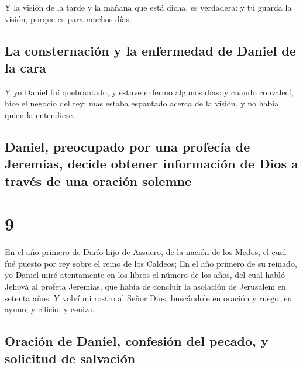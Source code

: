  Y la visión de la tarde y la mañana que está dicha, es
verdadera: y tú guarda la visión, porque es para muchos días.

\hypertarget{la-consternaciuxf3n-y-la-enfermedad-de-daniel-de-la-cara}{%
\subsection{La consternación y la enfermedad de Daniel de la
cara}\label{la-consternaciuxf3n-y-la-enfermedad-de-daniel-de-la-cara}}

 Y yo Daniel fuí quebrantado, y estuve enfermo algunos
días: y cuando convalecí, hice el negocio del rey; mas estaba espantado
acerca de la visión, y no había quien la entendiese.

\hypertarget{daniel-preocupado-por-una-profecuxeda-de-jeremuxedas-decide-obtener-informaciuxf3n-de-dios-a-travuxe9s-de-una-oraciuxf3n-solemne}{%
\subsection{Daniel, preocupado por una profecía de Jeremías, decide
obtener información de Dios a través de una oración
solemne}\label{daniel-preocupado-por-una-profecuxeda-de-jeremuxedas-decide-obtener-informaciuxf3n-de-dios-a-travuxe9s-de-una-oraciuxf3n-solemne}}

\hypertarget{section-8}{%
\section{9}\label{section-8}}

 En el año primero de Darío hijo de Assuero, de la nación
de los Medos, el cual fué puesto por rey sobre el reino de los Caldeos;
 En el año primero de su reinado, yo Daniel miré
atentamente en los libros el número de los años, del cual habló Jehová
al profeta Jeremías, que había de concluir la asolación de Jerusalem en
setenta años.  Y volví mi rostro al Señor Dios, buscándole
en oración y ruego, en ayuno, y cilicio, y ceniza.

\hypertarget{oraciuxf3n-de-daniel-confesiuxf3n-del-pecado-y-solicitud-de-salvaciuxf3n}{%
\subsection{Oración de Daniel, confesión del pecado, y solicitud de
salvación}\label{oraciuxf3n-de-daniel-confesiuxf3n-del-pecado-y-solicitud-de-salvaciuxf3n}}

